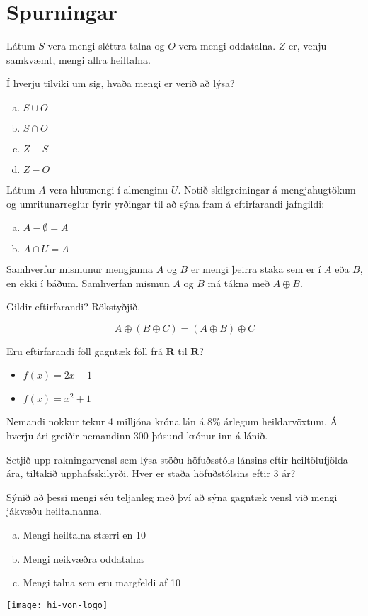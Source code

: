 \documentclass{exam}
\begin{document}
\section{Spurningar}
\begin{questions}
\question 

Látum $S$ vera mengi sléttra talna og $O$ vera mengi oddatalna. $Z$ er, venju samkvæmt, mengi allra heiltalna.

Í hverju tilviki um sig, hvaða mengi er verið að lýsa?

\begin{enumerate}[a)]
 \item $S \cup O$
 \item $S \cap O$
 \item $Z - S$
 \item $Z - O$
\end{enumerate}

\question

Látum $A$ vera hlutmengi í almenginu $U$. Notið skilgreiningar á mengjahugtökum og umritunarreglur fyrir yrðingar til að sýna fram á eftirfarandi jafngildi:

\begin{enumerate}[a)]
 \item $A - \emptyset = A$
 \item $A \cap U = A$
\end{enumerate}

\question Samhverfur mismunur mengjanna $A$ og $B$ er mengi þeirra staka sem er í $A$ eða $B$, en ekki í báðum. Samhverfan mismun $A$ og $B$ má tákna með $A \oplus B$.

Gildir eftirfarandi? Rökstyðjið.

\[
 A \oplus (B \oplus C) = (A \oplus B) \oplus C
\]

\question Eru eftirfarandi föll gagntæk föll frá $\mathbf{R}$ til $\mathbf{R}$?

\begin{itemize}
 \item $f(x) = 2x + 1$
 \item $f(x) = x^2 + 1$
\end{itemize}

\newpage

\question Nemandi nokkur tekur 4 milljóna króna lán á 8\% árlegum heildarvöxtum. Á hverju ári greiðir nemandinn 300 þúsund krónur inn á lánið.

Setjið upp rakningarvensl sem lýsa stöðu höfuðsstóls lánsins eftir heiltölufjölda ára, tiltakið upphafsskilyrði. Hver er staða höfuðstólsins eftir 3 ár?

\question Sýnið að þessi mengi séu teljanleg með því að sýna gagntæk vensl við mengi jákvæðu heiltalnanna.

\begin{enumerate}[a)]
 \item Mengi heiltalna stærri en 10
 \item Mengi neikvæðra oddatalna
 \item Mengi talna sem eru margfeldi af 10
\end{enumerate}

\end{questions}

\vfill
\texttt{[image: hi-von-logo]}
\end{document}
